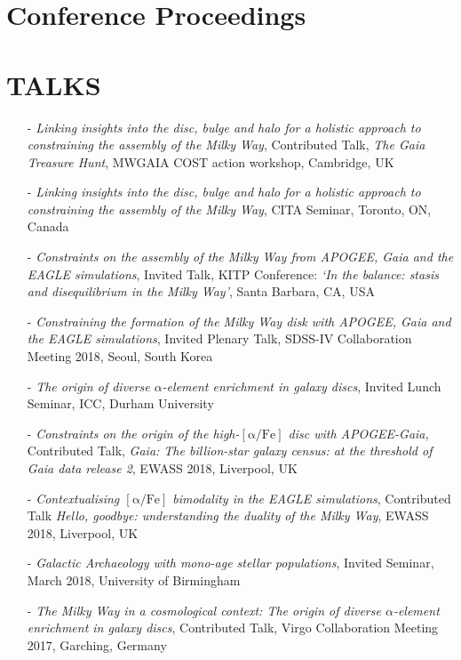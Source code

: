 \documentclass[margin]{res}
\begin{document}
\begin{resume}
\section{Conference Proceedings}
\begin{itemize}

 \end{itemize}
\section{TALKS}
\begin{itemize}
\item[-] \emph{Linking insights into the disc, bulge and halo for a holistic approach to constraining the assembly of the Milky Way}, Contributed Talk, \emph{The Gaia Treasure Hunt}, MWGAIA COST action workshop, Cambridge, UK
\item[-] \emph{Linking insights into the disc, bulge and halo for a holistic approach to constraining the assembly of the Milky Way}, CITA Seminar, Toronto, ON, Canada
\item[-] \emph{Constraints on the assembly of the Milky Way from APOGEE, \emph{Gaia} and the EAGLE simulations}, Invited Talk, KITP Conference: \emph{`In the balance: stasis and disequilibrium in the Milky Way'}, Santa Barbara, CA, USA
\item[-] \emph{Constraining the formation of the Milky Way disk with APOGEE, Gaia and the EAGLE simulations}, Invited Plenary Talk, SDSS-IV Collaboration Meeting 2018, Seoul, South Korea
\item[-]\emph{The origin of diverse $\alpha$-element enrichment in galaxy discs}, Invited Lunch Seminar, ICC, Durham University
\item[-] \emph{Constraints on the origin of the high-$\mathrm{[\alpha/Fe]}$ disc with APOGEE-\emph{Gaia},} Contributed Talk, \emph{Gaia: The billion-star galaxy census: at the threshold of Gaia data release 2}, EWASS 2018, Liverpool, UK
\item[-] \emph{Contextualising $\mathrm{[\alpha/Fe]}$ bimodality in the EAGLE simulations}, Contributed Talk \emph{Hello, goodbye: understanding the duality of the Milky Way}, EWASS 2018, Liverpool, UK
\item[-] \emph{Galactic Archaeology with mono-age stellar populations}, Invited Seminar, March 2018, University of Birmingham
\item[-] \emph{The Milky Way in a cosmological context: The origin of diverse $\alpha$-element enrichment in galaxy discs}, Contributed Talk, Virgo Collaboration Meeting 2017, Garching, Germany

\end{itemize}
\end{resume}
\end{document}
